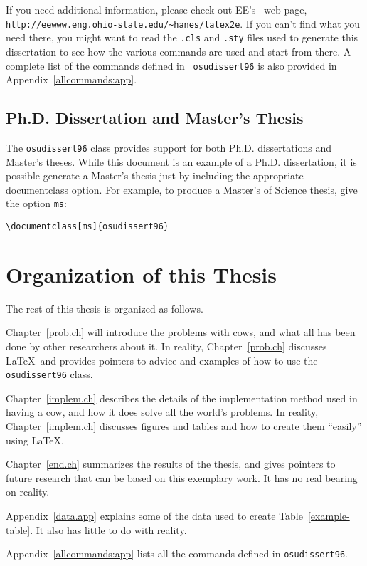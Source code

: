 If you need additional information, please check out EE's \LaTeXe\ web
page, {\verb+http://eewww.eng.ohio-state.edu/~hanes/latex2e+}.  If you
can't find what you need there, you might want to read the {\tt .cls} and
{\tt .sty} files used
to generate this dissertation to see how the various commands are used and
start from there. A complete list of the commands defined in {\tt
osudissert96} is also provided in Appendix~\ref{allcommands:app}.

\subsection{Ph.D. Dissertation and Master's Thesis}

The {\tt osudissert96} class provides support for both Ph.D.
dissertations and Master's theses. While this document is an example
of a Ph.D.  dissertation, it is possible generate a Master's thesis
just by including the appropriate documentclass option.  For example, to
produce a Master's of Science thesis, give the option {\tt ms}:

\begin{center}
{\verb+\documentclass[ms]{osudissert96}+}
\end{center}

\section{Organization of this Thesis}

The rest of this thesis is organized as follows. 

Chapter~\ref{prob.ch} will introduce the problems with cows, and what
all has been done by other researchers about it.  In reality,
Chapter~\ref{prob.ch} discusses \LaTeX\ and provides pointers to
advice and examples of how to use the {\tt osudissert96} class.

Chapter~\ref{implem.ch} describes the details of the implementation
method used in having a cow, and how it does solve all the world's
problems. In reality, Chapter~\ref{implem.ch} discusses figures and
tables and how to create them ``easily'' using \LaTeX.

Chapter~\ref{end.ch} summarizes the results of the thesis, and gives
pointers to future research that can be based on this exemplary work.
It has no real bearing on reality.

Appendix~\ref{data.app} explains some of the data used to create
Table~\ref{example-table}. It also has little to do with reality.

Appendix~\ref{allcommands:app} lists all the commands defined in
{\tt osudissert96}.
